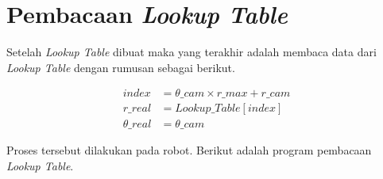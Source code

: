 

\section{Pembacaan \textit{Lookup Table}
  \label{sec:pembacaanlut}}

Setelah \textit{Lookup Table} dibuat maka yang terakhir adalah membaca data dari \textit{Lookup Table} dengan rumusan sebagai berikut.  

\begin{equation}
  \begin{aligned}
    index &= \theta\_cam \times r\_max + r\_cam \\
    r\_real &= \textit{Lookup\_Table}[index] \\
    \theta\_real &= \theta\_cam
  \end{aligned}
\end{equation}

Proses tersebut dilakukan pada robot. Berikut adalah program pembacaan \textit{Lookup Table}.

 
